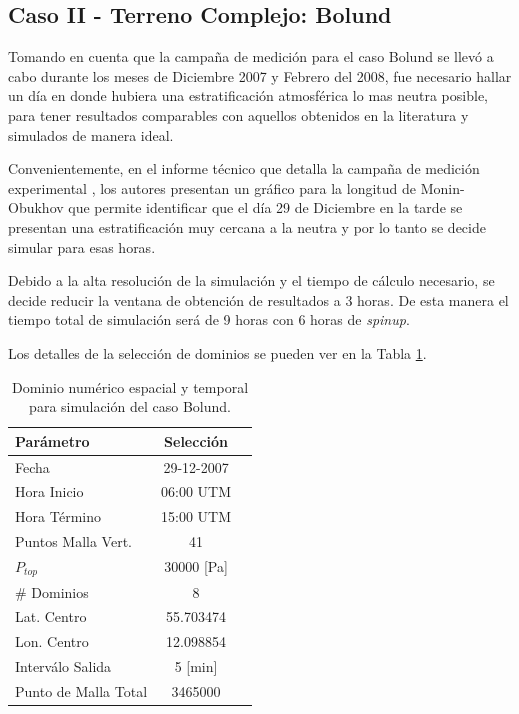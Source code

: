 \newpage










\subsection{Caso II - Terreno Complejo: Bolund}
Tomando en cuenta que la campaña de medición para el caso Bolund se llevó a cabo durante los meses de Diciembre 2007 y Febrero del 2008, fue necesario hallar un día en donde hubiera una estratificación atmosférica lo mas neutra posible, para tener resultados comparables con aquellos obtenidos en la literatura y simulados de manera ideal.

Convenientemente, en el informe técnico que detalla la campaña de medición experimental \citep{3d4285ac04444eb3b9775baf9af052c6}, los autores presentan un gráfico para la longitud de Monin-Obukhov que permite identificar que el día 29 de Diciembre en la tarde se presentan una estratificación muy cercana a la neutra y por lo tanto se decide simular para esas horas.

Debido a la alta resolución de la simulación y el tiempo de cálculo necesario, se decide reducir la ventana de obtención de resultados a 3 horas. De esta manera el tiempo total de simulación será de 9 horas con 6 horas de \emph{spinup}.

Los detalles de la selección de dominios se pueden ver en la Tabla \ref{tab:05_config_bol}.

\begin{table}[h!]
	\caption{Dominio numérico espacial y temporal para simulación del caso Bolund.}\label{tab:05_config_bol}
	\centering\footnotesize
	\begin{tabular}{lcc}
		\toprule
		Parámetro & Selección \\
		\midrule
		Fecha	 	 & 29-12-2007   \\
		Hora Inicio	 	 & 06:00 UTM\\
		Hora Término	 		 & 15:00 UTM\\
		Puntos Malla Vert.	 	 & 41   \\
		$P_{top}$ 	& 30000 [Pa]\\
		\# Dominios	& 8   \\
		Lat. Centro	& 55.703474   \\
		Lon. Centro	& 12.098854   \\
		Interválo Salida & 5 [min]\\
		Punto de Malla Total & 3465000\\
		\bottomrule
	\end{tabular}
\end{table}

